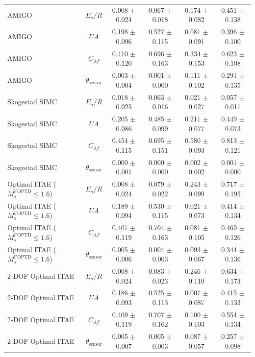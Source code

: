 \begin{table}[t]
{\begin{tabular}{lccccc}
AMIGO & $E_a/R$ & 0.008 $\pm$ 0.024 & 0.067 $\pm$ 0.018 & 0.174 $\pm$ 0.082 & 0.451 $\pm$ 0.138 \\
AMIGO & $UA$ & 0.198 $\pm$ 0.096 & 0.527 $\pm$ 0.115 & 0.081 $\pm$ 0.091 & 0.396 $\pm$ 0.100 \\
AMIGO & $C_{Af}$ & 0.410 $\pm$ 0.120 & 0.696 $\pm$ 0.163 & 0.334 $\pm$ 0.153 & 0.623 $\pm$ 0.108 \\
AMIGO & $\theta_{\mathrm{sensor}}$ & 0.003 $\pm$ 0.004 & 0.001 $\pm$ 0.000 & 0.111 $\pm$ 0.102 & 0.291 $\pm$ 0.135 \\
Skogestad SIMC & $E_a/R$ & 0.018 $\pm$ 0.025 & 0.063 $\pm$ 0.016 & 0.021 $\pm$ 0.027 & 0.057 $\pm$ 0.011 \\
Skogestad SIMC & $UA$ & 0.205 $\pm$ 0.086 & 0.485 $\pm$ 0.099 & 0.211 $\pm$ 0.077 & 0.449 $\pm$ 0.073 \\
Skogestad SIMC & $C_{Af}$ & 0.454 $\pm$ 0.115 & 0.695 $\pm$ 0.151 & 0.580 $\pm$ 0.093 & 0.813 $\pm$ 0.121 \\
Skogestad SIMC & $\theta_{\mathrm{sensor}}$ & 0.000 $\pm$ 0.001 & 0.000 $\pm$ 0.000 & 0.002 $\pm$ 0.002 & 0.001 $\pm$ 0.000 \\
Optimal ITAE ($M_s^{\mathrm{FOPTD}} \leq 1.6$) & $E_a/R$ & 0.008 $\pm$ 0.024 & 0.079 $\pm$ 0.022 & 0.243 $\pm$ 0.099 & 0.717 $\pm$ 0.195 \\
Optimal ITAE ($M_s^{\mathrm{FOPTD}} \leq 1.6$) & $UA$ & 0.189 $\pm$ 0.094 & 0.530 $\pm$ 0.115 & 0.021 $\pm$ 0.073 & 0.414 $\pm$ 0.134 \\
Optimal ITAE ($M_s^{\mathrm{FOPTD}} \leq 1.6$) & $C_{Af}$ & 0.407 $\pm$ 0.119 & 0.704 $\pm$ 0.163 & 0.081 $\pm$ 0.105 & 0.469 $\pm$ 0.126 \\
Optimal ITAE ($M_s^{\mathrm{FOPTD}} \leq 1.6$) & $\theta_{\mathrm{sensor}}$ & 0.005 $\pm$ 0.006 & 0.004 $\pm$ 0.003 & 0.093 $\pm$ 0.067 & 0.344 $\pm$ 0.136 \\
2-DOF Optimal ITAE & $E_a/R$ & 0.008 $\pm$ 0.024 & 0.083 $\pm$ 0.023 & 0.246 $\pm$ 0.110 & 0.634 $\pm$ 0.173 \\
2-DOF Optimal ITAE & $UA$ & 0.186 $\pm$ 0.093 & 0.525 $\pm$ 0.113 & 0.007 $\pm$ 0.087 & 0.415 $\pm$ 0.133 \\
2-DOF Optimal ITAE & $C_{Af}$ & 0.409 $\pm$ 0.119 & 0.707 $\pm$ 0.162 & 0.100 $\pm$ 0.103 & 0.554 $\pm$ 0.134 \\
2-DOF Optimal ITAE & $\theta_{\mathrm{sensor}}$ & 0.005 $\pm$ 0.007 & 0.005 $\pm$ 0.003 & 0.087 $\pm$ 0.057 & 0.257 $\pm$ 0.098 \\
\bottomrule
\end{tabular}%
}
\end{table}
